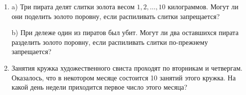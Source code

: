 \documentclass{article}
\begin{document}
\begin{enumerate}[label*=\protect\fbox{\arabic{enumi}}]
\item 
a) Три пирата делят слитки золота весом $1,2,\dots,10$ килограммов. Могут ли они поделить золото поровну, если распиливать слитки запрещается? 

b) При дележе один из пиратов был убит. Могут ли два оставшихся пирата разделить золото поровну, если распиливать слитки по-прежнему запрещается?

\item Занятия кружка художественного свиста проходят по вторникам и четвергам. Оказалось, что в некотором месяце состоится 10 занятий этого кружка. На какой день недели приходится первое число этого месяца?

\end{enumerate}
\end{document}
